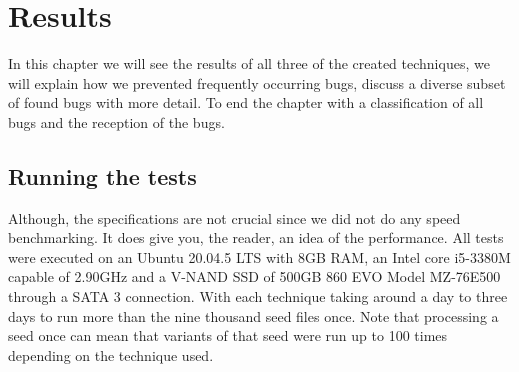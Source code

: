 \chapter{Results}
\label{cha:6:res}
\label{res:Intro}
In this chapter we will see the results of all three of the created techniques, we will explain how we prevented frequently occurring bugs, discuss a diverse subset of found bugs with more detail. To end the chapter with a classification of all bugs and the reception of the bugs.


\section{Running the tests}
\label{res:RunningTests}
\label{res:Specs}
Although, the specifications are not crucial since we did not do any speed benchmarking. It does give you, the reader, an idea of the performance. All tests were executed on an Ubuntu 20.04.5 LTS with 8GB RAM, an Intel core i5-3380M capable of 2.90GHz and a V-NAND SSD of 500GB 860 EVO Model MZ-76E500 through a SATA 3 connection. With each technique taking around a day to three days to run more than the nine thousand seed files once. Note that processing a seed once can mean that variants of that seed were run up to 100 times depending on the technique used.


